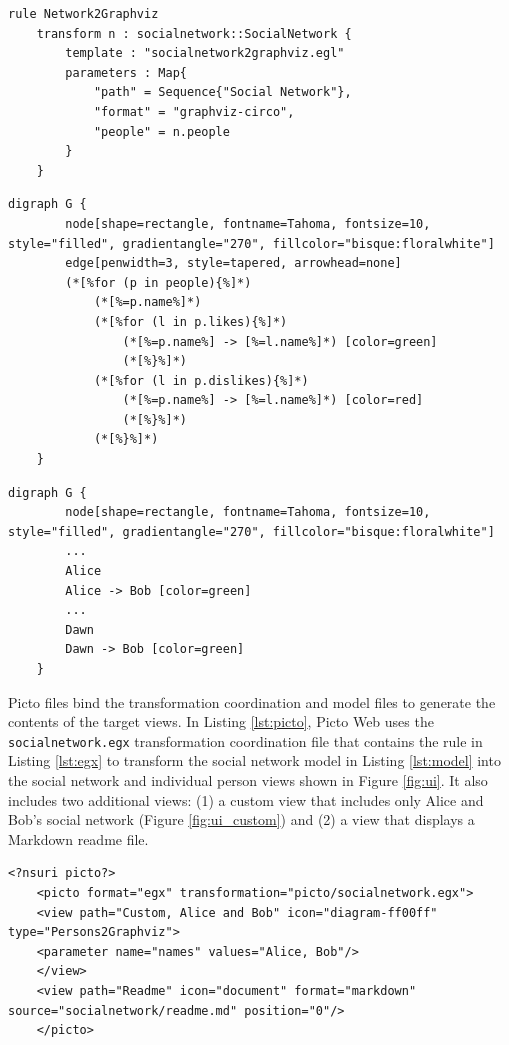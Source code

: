 \documentclass[preprint,12pt, a4paper]{elsarticle}
\begin{document}
\begin{lstlisting}[firstnumber=1,style=egx,caption={The Network2Graphviz EGX rule},label=lst:egx,float]
	rule Network2Graphviz 
	transform n : socialnetwork::SocialNetwork {
		template : "socialnetwork2graphviz.egl"
		parameters : Map{
			"path" = Sequence{"Social Network"},
			"format" = "graphviz-circo",
			"people" = n.people
		}
	}
\end{lstlisting}


\begin{lstlisting}[firstnumber=1,style=egx,caption={An EGL template that generates a Graphviz representation of a social network.},label=lst:egl,float]
	digraph G {
		node[shape=rectangle, fontname=Tahoma, fontsize=10, style="filled", gradientangle="270", fillcolor="bisque:floralwhite"]
		edge[penwidth=3, style=tapered, arrowhead=none]
		(*[%for (p in people){%]*)
			(*[%=p.name%]*)
			(*[%for (l in p.likes){%]*)
				(*[%=p.name%] -> [%=l.name%]*) [color=green]
				(*[%}%]*)
			(*[%for (l in p.dislikes){%]*)
				(*[%=p.name%] -> [%=l.name%]*) [color=red]
				(*[%}%]*)
			(*[%}%]*)
	}
\end{lstlisting}

\begin{lstlisting}[firstnumber=1,style=egx,caption={A view generated by the EGL template in Listing \ref{lst:egl}.},label=lst:output,float]
	digraph G {
		node[shape=rectangle, fontname=Tahoma, fontsize=10, style="filled", gradientangle="270", fillcolor="bisque:floralwhite"]
		...
		Alice
		Alice -> Bob [color=green]
		...
		Dawn
		Dawn -> Bob [color=green] 
	}
\end{lstlisting}

Picto files bind the transformation coordination and model files to generate the contents of the target views. In Listing \ref{lst:picto}, Picto Web uses the \texttt{socialnetwork.egx} transformation coordination file that contains the rule in Listing \ref{lst:egx} to transform the social network model in Listing \ref{lst:model} into the social network and individual person views shown in Figure \ref{fig:ui}. It also includes two additional views: (1) a custom view that includes only Alice and Bob's social network (Figure \ref{fig:ui_custom}) and (2) a view that displays a Markdown readme file.

\begin{lstlisting}[firstnumber=1,style=picto,caption={The Picto file that binds the model and the visualisation transformation.},label=lst:picto,float]
	<?nsuri picto?>
	<picto format="egx" transformation="picto/socialnetwork.egx">
	<view path="Custom, Alice and Bob" icon="diagram-ff00ff" type="Persons2Graphviz">
	<parameter name="names" values="Alice, Bob"/>
	</view>        
	<view path="Readme" icon="document" format="markdown" source="socialnetwork/readme.md" position="0"/>
	</picto>
\end{lstlisting}
\end{document}
